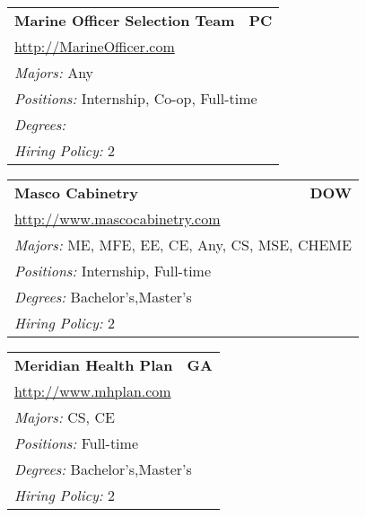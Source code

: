 \documentclass[twoside]{article}
\begin{document}
\begin{center}
\begin{multicols}{3}
\begin{FlushLeft}
\begin{minipage}{.9\columnwidth}
\end{minipage}
 
\begin{minipage}{.9\columnwidth}\begin{tabularx}{.95\columnwidth}{Xr}
                 {\Large\bf Marine Officer Selection Team} & {\Large\bf PC}\\
    \multicolumn{2}{p{.95\columnwidth}}{\url{http://MarineOfficer.com}}\\
    \multicolumn{2}{p{.95\columnwidth}}{\emph{Majors:} Any}\\
    \multicolumn{2}{p{.95\columnwidth}}{\emph{Positions:} Internship, Co-op, Full-time}\\
    \multicolumn{2}{p{.95\columnwidth}}{\emph{Degrees:} }\\
    \multicolumn{2}{p{.95\columnwidth}}{\emph{Hiring Policy:} 2}\\
    \end{tabularx}
    
\end{minipage}
 
\begin{minipage}{.9\columnwidth}\begin{tabularx}{.95\columnwidth}{Xr}
                 {\Large\bf Masco Cabinetry} & {\Large\bf DOW}\\
    \multicolumn{2}{p{.95\columnwidth}}{\url{http://www.mascocabinetry.com}}\\
    \multicolumn{2}{p{.95\columnwidth}}{\emph{Majors:} ME, MFE, EE, CE, Any, CS, MSE, CHEME}\\
    \multicolumn{2}{p{.95\columnwidth}}{\emph{Positions:} Internship, Full-time}\\
    \multicolumn{2}{p{.95\columnwidth}}{\emph{Degrees:} Bachelor's,Master's}\\
    \multicolumn{2}{p{.95\columnwidth}}{\emph{Hiring Policy:} 2}\\
    \end{tabularx}
    
\end{minipage}
 
\begin{minipage}{.9\columnwidth}\begin{tabularx}{.95\columnwidth}{Xr}
                 {\Large\bf Meridian Health Plan} & {\Large\bf GA}\\
    \multicolumn{2}{p{.95\columnwidth}}{\url{http://www.mhplan.com}}\\
    \multicolumn{2}{p{.95\columnwidth}}{\emph{Majors:} CS, CE}\\
    \multicolumn{2}{p{.95\columnwidth}}{\emph{Positions:} Full-time}\\
    \multicolumn{2}{p{.95\columnwidth}}{\emph{Degrees:} Bachelor's,Master's}\\
    \multicolumn{2}{p{.95\columnwidth}}{\emph{Hiring Policy:} 2}\\
    \end{tabularx}
    

\end{minipage}
\end{FlushLeft}
\end{multicols}
\end{center}
\end{document}
